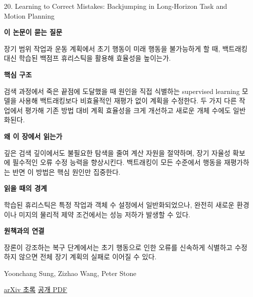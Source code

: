 \documentclass[11pt,openany]{book}
\begin{document}
\begin{termcard}{20. Learning to Correct Mistakes: Backjumping in Long-Horizon Task and Motion Planning}

\par

\medskip

{\sffamily\bfseries\color{deepblue} 이 논문이 묻는 질문}\par

장기 범위 작업과 운동 계획에서 초기 행동이 미래 행동을 불가능하게 할 때, 백트래킹 대신 학습된 백점프 휴리스틱을 활용해 효율성을 높이는가.

\smallskip

{\sffamily\bfseries\color{deepblue} 핵심 구조}\par

검색 과정에서 죽은 끝점에 도달했을 때 원인을 직접 식별하는 supervised learning 모델을 사용해 백트래킹보다 비효율적인 재평가 없이 계획을 수정한다. 두 가지 다른 작업에서 평가해 기존 방법 대비 계획 효율성을 크게 개선하고 새로운 개체 수에도 일반화된다.

\smallskip

{\sffamily\bfseries\color{deepblue} 왜 이 장에서 읽는가}\par

깊은 검색 깊이에서도 불필요한 탐색을 줄여 계산 자원을 절약하며, 장기 자율성 확보에 필수적인 오류 수정 능력을 향상시킨다. 백트래킹이 모든 수준에서 행동을 재평가하는 반면 이 방법은 핵심 원인만 집중한다.

\smallskip

{\sffamily\bfseries\color{coral} 읽을 때의 경계}\par

학습된 휴리스틱은 특정 작업과 객체 수 설정에서 일반화되었으나, 완전히 새로운 환경이나 미지의 물리적 제약 조건에서는 성능 저하가 발생할 수 있다.

\smallskip

{\sffamily\bfseries\color{teal} 원책과의 연결}\par

장론이 강조하는 복구 단계에서는 초기 행동으로 인한 오류를 신속하게 식별하고 수정하지 않으면 전체 장기 계획의 실패로 이어질 수 있다.

\medskip

{\footnotesize\color{muted} Yoonchang Sung, Zizhao Wang, Peter Stone\par

\href{https://arxiv.org/abs/2211.07847}{arXiv 초록} \quad \href{https://arxiv.org/pdf/2211.07847}{공개 PDF}\par}

\end{termcard}
\end{document}
